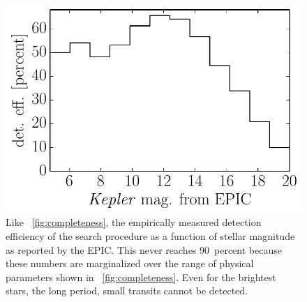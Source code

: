 \documentclass[12pt,preprint]{aastex}
\newcommand{\figref}[1]{\ref{fig:#1}}
\newcommand{\Fig}[1]{\figurename~\figref{#1}}
\newcommand{\fig}[1]{\Fig{#1}}
\newcommand{\figlabel}[1]{\label{fig:#1}}
\begin{document}
\begin{figure}[p]
\begin{center}
\includegraphics{figures/completeness-mag.pdf}
\end{center}
\caption{%
Like \fig{completeness}, the empirically measured detection efficiency of the
search procedure as a function of stellar magnitude as reported by the EPIC.
This never reaches 90~percent because these numbers are marginalized over the
range of physical parameters shown in \fig{completeness}.
Even for the brightest stars, the long period, small transits cannot be
detected.
\figlabel{completeness-mag}}
\end{figure}
\end{document}
